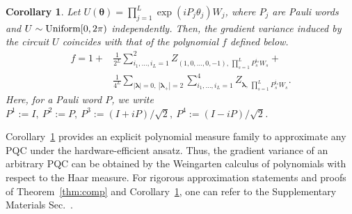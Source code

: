 \documentclass[%
 reprint,
 superscriptaddress,
 amsmath,amssymb,
 aps, prl, twocolumn, showpacs,
]{revtex4-2}
\newtheorem{corollary}{Corollary}[theorem]
\newcommand{\RomanNumeralCaps}[1]
    {\MakeUppercase{\romannumeral #1}}
\newcommand*{\dif}{\mathop{}\!\mathrm{d}}
\begin{document}
\begin{corollary}
Let $U(\boldsymbol\theta) = \prod_{j=1}^L\exp(iP_j\theta_j)W_j$, where $P_j$ are Pauli words and $U\sim {\rm Uniform}[0,2\pi)$ independently. Then, the gradient variance induced by the circuit $U$ coincides with that of the polynomial $f$ defined below.
\begin{equation}
    \begin{aligned}
      f = 1 + &\frac{1}{2^{L}}\sum_{i_1,\ldots,i_L=1}^{2} Z_{(1,0,\ldots,0,-1),\,\prod_{s=1}^{L} P_s^{i_s}W_s}+\\
       &\frac{1}{4^{L}}\sum_{|{\boldsymbol\lambda}|=0,\ |{\boldsymbol\lambda}_+|=2}\sum_{i_1,\ldots,i_L=1}^{4}Z_{{\boldsymbol\lambda},\,\prod_{s=1}^{L} P_s^{i_s}W_s}.
    \end{aligned}
\end{equation}
Here, for a Pauli word $P$, we write $ P^1 := I, \ P^2 := P, \ P^3 := (I+iP)/\sqrt{2}, \ P^4 := (I-iP)/\sqrt{2}$.
\label{cor:approx_prac}
\end{corollary}
Corollary~\ref{cor:approx_prac} provides an explicit polynomial measure family to approximate any PQC under the hardware-efficient ansatz. Thus, the gradient variance of an arbitrary PQC can be obtained by the Weingarten calculus of polynomials with respect to the Haar measure.
For rigorous approximation statements and proofs of Theorem~\ref{thm:comp} and Corollary~\ref{cor:approx_prac}, one can refer to the Supplementary Materials Sec.~\RomanNumeralCaps{2}.
\end{document}

